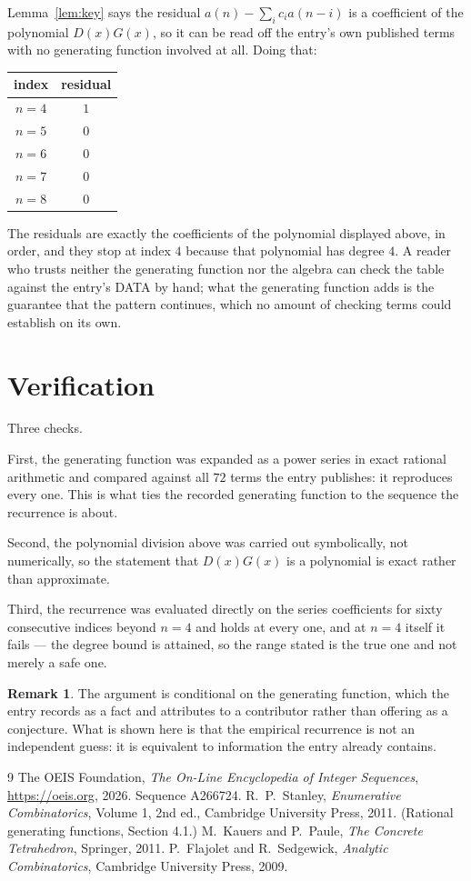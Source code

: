 \documentclass[11pt,a4paper]{article}
\theoremstyle{plain}
\theoremstyle{definition}
\newtheorem{remark}[theorem]{Remark}
\begin{document}
Lemma~\ref{lem:key} says the residual $a(n)-\sum_ic_ia(n-i)$ is a coefficient of the
polynomial $D(x)G(x)$, so it can be read off the entry's own published terms with no
generating function involved at all. Doing that:
\begin{center}
\begin{tabular}{cc}
index & residual \\ \hline
$n=4$ & $1$ \\
$n=5$ & $0$ \\
$n=6$ & $0$ \\
$n=7$ & $0$ \\
$n=8$ & $0$
\end{tabular}
\end{center}
The residuals are exactly the coefficients of the polynomial displayed above, in order, and
they stop at index $4$ because that polynomial has degree $4$. A reader who trusts
neither the generating function nor the algebra can check the table against the entry's DATA
by hand; what the generating function adds is the guarantee that the pattern continues, which
no amount of checking terms could establish on its own.

\section{Verification}

Three checks.

First, the generating function was expanded as a power series in exact rational arithmetic and
compared against all $72$ terms the entry publishes: it reproduces every one. This is
what ties the recorded generating function to the sequence the recurrence is about.

Second, the polynomial division above was carried out symbolically, not numerically, so the
statement that $D(x)G(x)$ is a polynomial is exact rather than approximate.

Third, the recurrence was evaluated directly on the series coefficients for sixty consecutive
indices beyond $n=4$ and holds at every one, and at $n=4$ itself it fails --- the
degree bound is attained, so the range stated is the true one and not merely a safe one.

\begin{remark}
The argument is conditional on the generating function, which the entry records as a fact and
attributes to a contributor rather than offering as a conjecture. What is shown here is that
the empirical recurrence is not an independent guess: it is equivalent to information the
entry already contains.
\end{remark}

\begin{thebibliography}{9}
 The OEIS Foundation, \emph{The On-Line Encyclopedia of Integer
Sequences}, \url{https://oeis.org}, 2026. Sequence A266724.
 R.~P.~Stanley, \emph{Enumerative Combinatorics}, Volume 1, 2nd ed.,
Cambridge University Press, 2011. (Rational generating functions, Section 4.1.)
 M.~Kauers and P.~Paule, \emph{The Concrete Tetrahedron}, Springer, 2011.
 P.~Flajolet and R.~Sedgewick, \emph{Analytic Combinatorics}, Cambridge
University Press, 2009.
\end{thebibliography}
\end{document}
